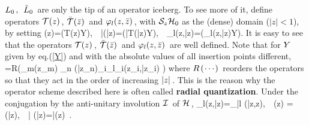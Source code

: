 $L_0\hspace{0.05cm},\ \hspace{0.05cm}\tilde L_0\hspace{0.05cm}$ are only the
tip of an operator iceberg. To see more of it,
define operators \s${\cal T}(z)\hspace{0.05cm}$,
\s${\bar{{\cal T}}}(\bar z)\hspace{0.05cm}$
and \s$\varphi_l(z,\bar z)\hspace{0.05cm}$, \s with ${\cal S}_{z}{\cal H}_0$
as the (dense) domain ($|z|<1$),  by setting
\qq
\CT(z)\s\CY\s=\s\iota(T(z)\s Y)\s,\quad\ \
\bar\CT(\bar z)\s\CY\s=\s\iota(\bar T(\bar z)\s Y)\s,\quad\ \
\varphi_l(z,\bar z)\s\CY\s=\s\iota(\phi_l(z,\bar z)\s Y)\s.
\non
\qqq
It is easy to see that the operators
\s${\cal T}(z)\hspace{0.05cm}$, \s$\bar{{\cal T}}(\bar z)\hspace{0.05cm}$
and \s$\varphi_l(z,\bar z)\hspace{0.05cm}$ are well defined.
Note that for \s$Y\hspace{0.05cm}$ given by eq.\s\s(\ref{Y}) and
with the absolute values of all insertion points different,
\qq
\CY\s=\s R\left(\m\prod\limits_m\m \CT(z_m)\s
\prod\limits_n\m {\bar\CT}
(\bar z_n)\s\prod\limits_i\varphi_{l_i}(z_i,\m \bar z_i)
\right)\m\Omega
\label{RQ}
\qqq
where \s$R\hspace{0.05cm}(\hspace{0.025cm}\cdots\hspace{0.025cm})\hspace{0.05cm}$
reorders the operators so that they act
in the order of increasing \s$|z|\hspace{0.05cm}$.
This is the reason why the operator scheme described here
is often called {\bf radial quantization}. Under
the conjugation by
the anti-unitary involution \s${\cal I}\hspace{0.05cm}$ of \s${\cal H}\hspace{0.05cm}$,
\qq
\CI\m\varphi_l(z,\bar z)\m\CI\s=\s\varphi_{\m\bar l\m}
(\bar z,\m z)\s,\ \ \s\CI\m\CT(z)\m\CI\s
=\s\CT(\bar z)\s,\ \ \s\CI\m\bar\CT
(\bar z)\m\CI\s=\s\bar\CT(z)\ .
\label{CII}
\qqq
\vs 0.3cm

